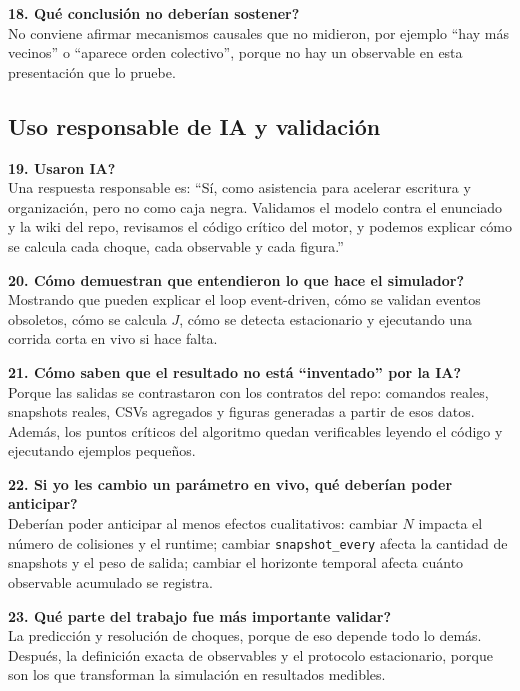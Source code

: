 \documentclass[11pt]{article}
\begin{document}
\textbf{18. \textquestiondown Qu\'e conclusi\'on no deber\'ian sostener?}\\
No conviene afirmar mecanismos causales que no midieron, por ejemplo ``hay m\'as vecinos'' o ``aparece orden colectivo'', porque no hay un observable en esta presentaci\'on que lo pruebe.

\subsection{Uso responsable de IA y validaci\'on}

\textbf{19. \textquestiondown Usaron IA?}\\
Una respuesta responsable es: ``S\'i, como asistencia para acelerar escritura y organizaci\'on, pero no como caja negra. Validamos el modelo contra el enunciado y la wiki del repo, revisamos el c\'odigo cr\'itico del motor, y podemos explicar c\'omo se calcula cada choque, cada observable y cada figura.'' 

\textbf{20. \textquestiondown C\'omo demuestran que entendieron lo que hace el simulador?}\\
Mostrando que pueden explicar el loop event-driven, c\'omo se validan eventos obsoletos, c\'omo se calcula $J$, c\'omo se detecta estacionario y ejecutando una corrida corta en vivo si hace falta.

\textbf{21. \textquestiondown C\'omo saben que el resultado no est\'a ``inventado'' por la IA?}\\
Porque las salidas se contrastaron con los contratos del repo: comandos reales, snapshots reales, CSVs agregados y figuras generadas a partir de esos datos. Adem\'as, los puntos cr\'iticos del algoritmo quedan verificables leyendo el c\'odigo y ejecutando ejemplos peque\~nos.

\textbf{22. \textquestiondown Si yo les cambio un par\'ametro en vivo, qu\'e deber\'ian poder anticipar?}\\
Deber\'ian poder anticipar al menos efectos cualitativos: cambiar $N$ impacta el n\'umero de colisiones y el runtime; cambiar \texttt{snapshot\_every} afecta la cantidad de snapshots y el peso de salida; cambiar el horizonte temporal afecta cu\'anto observable acumulado se registra.

\textbf{23. \textquestiondown Qu\'e parte del trabajo fue m\'as importante validar?}\\
La predicci\'on y resoluci\'on de choques, porque de eso depende todo lo dem\'as. Despu\'es, la definici\'on exacta de observables y el protocolo estacionario, porque son los que transforman la simulaci\'on en resultados medibles.
\end{document}
